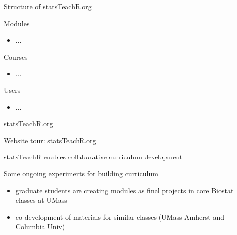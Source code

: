 

\begin{frame}{Structure of statsTeachR.org}

\begin{block}{Modules}
\begin{itemize}
        \item ...
\end{itemize}
\end{block}

\begin{block}{Courses}
\begin{itemize}
        \item ...
\end{itemize}
\end{block}

\begin{block}{Users}
\begin{itemize}
        \item ...
\end{itemize}
\end{block}


\end{frame}



\begin{frame}{statsTeachR.org}

Website tour: \href{http://statsTeachR.org}{statsTeachR.org}

\end{frame}


\begin{frame}{statsTeachR enables collaborative curriculum development}

\begin{block}{Some ongoing experiments for building curriculum}
\begin{itemize}
        \item graduate students are creating modules as final projects in core Biostat classes at UMass
        \item co-development of materials for similar classes (UMass-Amherst and Columbia Univ) 
\end{itemize}
\end{block}


\end{frame}



